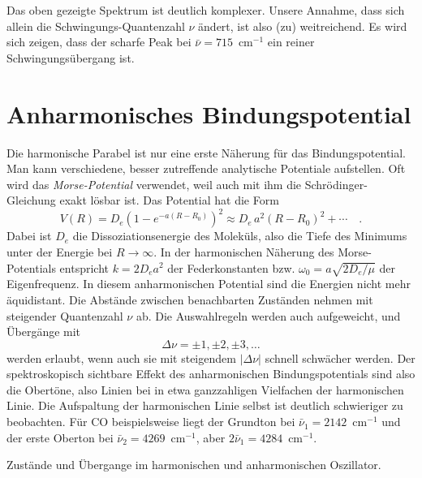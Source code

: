 Das oben gezeigte Spektrum ist deutlich komplexer. Unsere Annahme, dass sich allein die Schwingungs-Quantenzahl $\nu$ ändert, ist also (zu) weitreichend. Es wird sich zeigen, dass der scharfe Peak bei $\bar{\nu} = 715$~cm$^{-1}$ ein reiner Schwingungsübergang ist.

\section{Anharmonisches Bindungspotential}

Die harmonische Parabel ist nur eine erste Näherung für das Bindungspotential. Man kann verschiedene, besser zutreffende analytische Potentiale aufstellen. Oft wird das \emph{Morse-Potential} verwendet, weil auch mit ihm  die Schrödinger-Gleichung exakt lösbar ist. Das Potential hat die Form
\begin{equation}
 V(R) = D_e \left( 1 - e^{-a (R - R_0)} \right)^2 \approx D_e \, a^2 (R - R_0)^2 + \cdots \quad .
\end{equation}
Dabei ist $D_e$ die Dissoziationsenergie des Moleküls, also die Tiefe des Minimums unter der Energie bei $R \rightarrow \infty$. In der harmonischen Näherung des Morse-Potentials entspricht $k = 2 D_e a^2$ der Federkonstanten bzw. $\omega_0 = a \sqrt{2 D_e / \mu}$ der Eigenfrequenz. In diesem anharmonischen Potential  sind die Energien nicht mehr äquidistant. Die Abstände zwischen benachbarten Zuständen nehmen mit steigender Quantenzahl $\nu$ ab. Die Auswahlregeln werden auch aufgeweicht, und Übergänge mit 
\begin{equation}
\Delta \nu = \pm 1, \pm 2 , \pm 3, \dots
\end{equation}
werden erlaubt, wenn auch sie mit steigendem $|\Delta \nu |$ schnell schwächer werden. Der spektroskopisch sichtbare Effekt des anharmonischen Bindungspotentials sind also die Obertöne, also Linien bei in etwa ganzzahligen Vielfachen der harmonischen Linie. Die Aufspaltung der harmonischen Linie selbst ist deutlich schwieriger zu beobachten. Für CO beispielsweise liegt der Grundton bei $\bar{\nu}_1 = 2142$~cm$^{-1}$ und der erste Oberton bei 
 $\bar{\nu}_2 = 4269$~cm$^{-1}$, aber $2 \bar{\nu}_1 = 4284$~cm$^{-1}$.
 
\begin{marginfigure}
\caption{Zustände und Übergange im harmonischen und anharmonischen Oszillator.}
\end{marginfigure}
 
 
 

